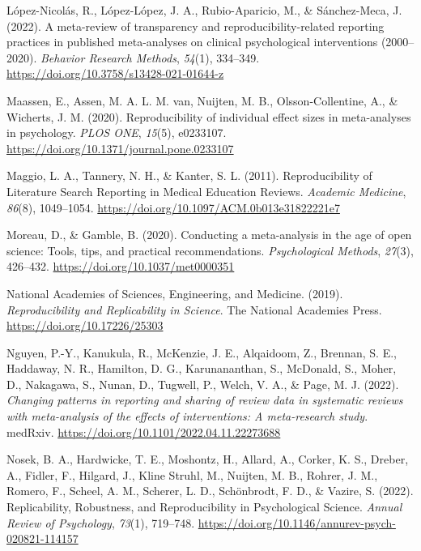 \documentclass[
  ,jou, a4paper,floatsintext]{apa6}
\newlength{\cslhangindent}
\newlength{\cslentryspacingunit} %
\newenvironment{CSLReferences}[2] %
 {%
  \setlength{\parindent}{0pt}
  \ifodd #1
  \let\oldpar\par
  \def\par{\hangindent=\cslhangindent\oldpar}
  \fi
  \setlength{\parskip}{#2\cslentryspacingunit}
 }%
 {}
\begin{document}
\begin{CSLReferences}{1}{0}
\leavevmode{}%
López-Nicolás, R., López-López, J. A., Rubio-Aparicio, M., \& Sánchez-Meca, J. (2022). A meta-review of transparency and reproducibility-related reporting practices in published meta-analyses on clinical psychological interventions (2000--2020). \emph{Behavior Research Methods}, \emph{54}(1), 334--349. \url{https://doi.org/10.3758/s13428-021-01644-z}

\leavevmode{}%
Maassen, E., Assen, M. A. L. M. van, Nuijten, M. B., Olsson-Collentine, A., \& Wicherts, J. M. (2020). Reproducibility of individual effect sizes in meta-analyses in psychology. \emph{PLOS ONE}, \emph{15}(5), e0233107. \url{https://doi.org/10.1371/journal.pone.0233107}

\leavevmode{}%
Maggio, L. A., Tannery, N. H., \& Kanter, S. L. (2011). Reproducibility of {Literature} {Search} {Reporting} in {Medical} {Education} {Reviews}. \emph{Academic Medicine}, \emph{86}(8), 1049--1054. \url{https://doi.org/10.1097/ACM.0b013e31822221e7}

\leavevmode{}%
Moreau, D., \& Gamble, B. (2020). Conducting a meta-analysis in the age of open science: Tools, tips, and practical recommendations. \emph{Psychological Methods}, \emph{27}(3), 426--432. \url{https://doi.org/10.1037/met0000351}

\leavevmode{}%
National Academies of Sciences, Engineering, and Medicine. (2019). \emph{Reproducibility and {Replicability} in {Science}}. {The National Academies Press}. \url{https://doi.org/10.17226/25303}

\leavevmode{}%
Nguyen, P.-Y., Kanukula, R., McKenzie, J. E., Alqaidoom, Z., Brennan, S. E., Haddaway, N. R., Hamilton, D. G., Karunananthan, S., McDonald, S., Moher, D., Nakagawa, S., Nunan, D., Tugwell, P., Welch, V. A., \& Page, M. J. (2022). \emph{Changing patterns in reporting and sharing of review data in systematic reviews with meta-analysis of the effects of interventions: A meta-research study}. medRxiv. \url{https://doi.org/10.1101/2022.04.11.22273688}

\leavevmode{}%
Nosek, B. A., Hardwicke, T. E., Moshontz, H., Allard, A., Corker, K. S., Dreber, A., Fidler, F., Hilgard, J., Kline Struhl, M., Nuijten, M. B., Rohrer, J. M., Romero, F., Scheel, A. M., Scherer, L. D., Schönbrodt, F. D., \& Vazire, S. (2022). Replicability, {Robustness}, and {Reproducibility} in {Psychological Science}. \emph{Annual Review of Psychology}, \emph{73}(1), 719--748. \url{https://doi.org/10.1146/annurev-psych-020821-114157}


\end{CSLReferences}
\end{document}
